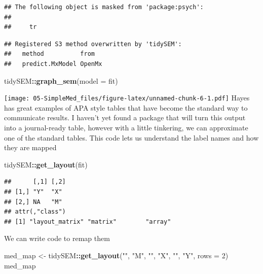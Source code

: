 \documentclass[
  11pt,
]{book}
\newenvironment{Shaded}{\begin{snugshade}}{\end{snugshade}}
\newcommand{\AttributeTok}[1]{\textcolor[rgb]{0.27,0.27,0.27}{#1}}
\newcommand{\DecValTok}[1]{\textcolor[rgb]{0.06,0.06,0.06}{#1}}
\newcommand{\FunctionTok}[1]{\textcolor[rgb]{0.27,0.27,0.27}{\textbf{#1}}}
\newcommand{\NormalTok}[1]{#1}
\newcommand{\OtherTok}[1]{\textcolor[rgb]{0.37,0.37,0.37}{#1}}
\newcommand{\SpecialCharTok}[1]{\textcolor[rgb]{0.43,0.43,0.43}{\textbf{#1}}}
\newcommand{\StringTok}[1]{\textcolor[rgb]{0.5,0.5,0.5}{#1}}
\begin{document}
\begin{verbatim}
## The following object is masked from 'package:psych':
## 
##     tr
\end{verbatim}

\begin{verbatim}
## Registered S3 method overwritten by 'tidySEM':
##   method          from  
##   predict.MxModel OpenMx
\end{verbatim}

\begin{Shaded}
\begin{Highlighting}[]
\NormalTok{tidySEM}\SpecialCharTok{::}\FunctionTok{graph\_sem}\NormalTok{(}\AttributeTok{model =}\NormalTok{ fit)}
\end{Highlighting}
\end{Shaded}

\texttt{[image: 05-SimpleMed\_files/figure-latex/unnamed-chunk-6-1.pdf]} Hayes has great examples of APA style tables that have become the standard way to communicate results. I haven't yet found a package that will turn this output into a journal-ready table, however with a little tinkering, we can approximate one of the standard tables. This code lets us understand the label names and how they are mapped

\begin{Shaded}
\begin{Highlighting}[]
\NormalTok{tidySEM}\SpecialCharTok{::}\FunctionTok{get\_layout}\NormalTok{(fit)}
\end{Highlighting}
\end{Shaded}

\begin{verbatim}
##      [,1] [,2]
## [1,] "Y"  "X" 
## [2,] NA   "M" 
## attr(,"class")
## [1] "layout_matrix" "matrix"        "array"
\end{verbatim}

We can write code to remap them

\begin{Shaded}
\begin{Highlighting}[]
\NormalTok{med\_map }\OtherTok{\textless{}{-}}\NormalTok{ tidySEM}\SpecialCharTok{::}\FunctionTok{get\_layout}\NormalTok{(}\StringTok{""}\NormalTok{, }\StringTok{"M"}\NormalTok{, }\StringTok{""}\NormalTok{, }\StringTok{"X"}\NormalTok{, }\StringTok{""}\NormalTok{, }\StringTok{"Y"}\NormalTok{, }\AttributeTok{rows =} \DecValTok{2}\NormalTok{)}
\NormalTok{med\_map}
\end{Highlighting}
\end{Shaded}
\end{document}
